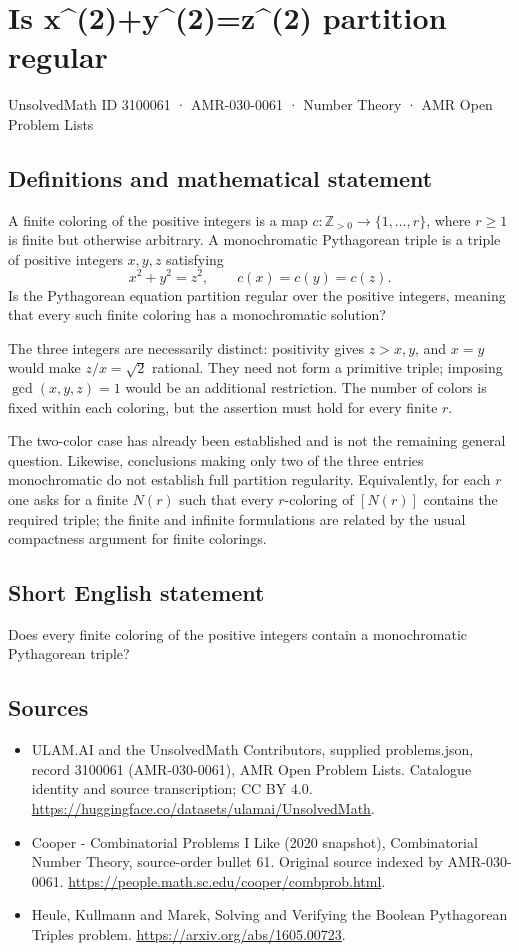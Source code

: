 \documentclass[11pt,a4paper]{article}
\begin{document}
\section*{Is x\textasciicircum{}(2)+y\textasciicircum{}(2)=z\textasciicircum{}(2) partition regular}\label{3100061}
{\small UnsolvedMath ID 3100061 · AMR-030-0061 · Number Theory · AMR Open Problem Lists}
\subsection{Definitions and mathematical statement}
A finite coloring of the positive integers is a map
$c:\mathbb Z_{>0}\to\{1,\ldots,r\}$, where $r\ge1$ is finite
but otherwise arbitrary. A monochromatic Pythagorean triple is
a triple of positive integers $x,y,z$ satisfying
\[
                  x^2+y^2=z^2,
                    \qquad c(x)=c(y)=c(z).
\]
Is the Pythagorean equation partition regular over the positive
integers, meaning that every such finite coloring has a
monochromatic solution?

The three integers are necessarily distinct: positivity gives
$z>x,y$, and $x=y$ would make $z/x=\sqrt2$ rational. They need
not form a primitive triple; imposing $\gcd(x,y,z)=1$ would be
an additional restriction. The number of colors is fixed within
each coloring, but the assertion must hold for every finite $r$.

The two-color case has already been established and is not the
remaining general question. Likewise, conclusions making only
two of the three entries monochromatic do not establish full
partition regularity. Equivalently, for each $r$ one asks for a
finite $N(r)$ such that every $r$-coloring of $[N(r)]$ contains
the required triple; the finite and infinite formulations are
related by the usual compactness argument for finite colorings.
\subsection{Short English statement}
Does every finite coloring of the positive integers contain a monochromatic Pythagorean triple?
\subsection{Sources}
\begin{itemize}
\item[S1] ULAM.AI and the UnsolvedMath Contributors, supplied problems.json, record 3100061 (AMR-030-0061), AMR Open Problem Lists. Catalogue identity and source transcription; CC BY 4.0.
\url{https://huggingface.co/datasets/ulamai/UnsolvedMath}.
\item[S2] Cooper - Combinatorial Problems I Like (2020 snapshot), Combinatorial Number Theory, source-order bullet 61. Original source indexed by AMR-030-0061.
\url{https://people.math.sc.edu/cooper/combprob.html}.
\item[S3] Heule, Kullmann and Marek, Solving and Verifying the Boolean Pythagorean Triples problem.
\url{https://arxiv.org/abs/1605.00723}.
\end{itemize}
\end{document}
